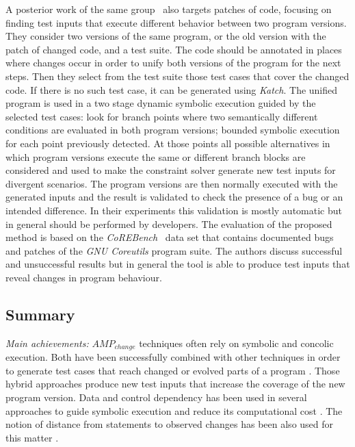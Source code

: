 A posterior work of the same group~\cite{palikareva2016shadow} also targets patches of code, focusing on finding test inputs that execute different behavior between two program versions. 
They consider two versions of the same program, or the old version with the patch of changed code, and a test suite. 
The code should be annotated in places where changes occur in order to unify both versions of the program for the next steps. 
Then they select from the test suite those test cases that cover the changed code. 
If there is no such test case, it can be generated using \emph{Katch}.  
The unified program is used in a two stage dynamic symbolic execution guided by the selected test cases: look for branch points where two semantically different conditions are evaluated in both program versions; bounded symbolic execution for each point previously detected. 
At those points all possible alternatives in which program versions execute the same or different branch blocks are considered and used to make the constraint solver generate new test inputs for divergent scenarios. 
The program versions are then normally executed with the generated inputs and the result is validated to check the presence of a bug or an intended difference. 
In their experiments this validation is mostly automatic but in general should be performed by developers.
The evaluation of the proposed method is based on the \emph{CoREBench}~\cite{bohme2014corebench} data set that contains documented bugs and patches of the \emph{GNU Coreutils} program suite. 
The authors discuss successful and unsuccessful results but in general the tool is able to produce test inputs that reveal changes in program behaviour.

\subsection{Summary}
\label{subsec:sota:category-2:summary}

\emph{Main achievements:}
$AMP_{change}$ techniques often rely on symbolic and concolic execution. 
Both have been successfully combined with other techniques in order to generate test cases that reach changed or evolved parts of a program \cite{xu2011hybrid,xu2015directed,marinescu2013katch}.
Those hybrid approaches produce new test inputs that increase the coverage of the new program version. Data and control dependency has been used in several approaches to guide symbolic execution and reduce its computational cost \cite{bohme2013regression,marinescu2013katch,xwang2014directed}. 
The notion of distance from statements to observed changes has been also used for this matter \cite{marinescu2013katch,apiwattanapong2006matrix}.


